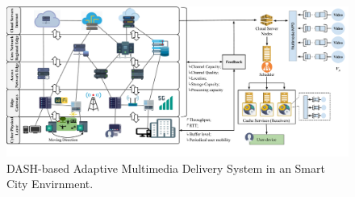 \vspace{1cm}
\begin{figure}[htpb]
	\centering
	\includegraphics[width=1.0\textwidth]{images/scenario_incomplete}
	\vspace{-1cm}

	\caption{DASH-based Adaptive Multimedia Delivery System in an Smart City Envirnment.}

	\label{fig:scenario-arch}
\end{figure}




